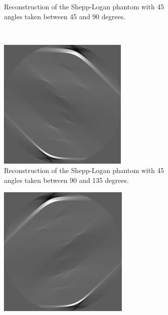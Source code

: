 \begin{figure}
\begin{subfigure}{0.48\linewidth}
		\caption{Reconstruction of the Shepp-Logan phantom with 45 angles taken between 45 and 90 degrees.}
	\end{subfigure}
	\\
	\begin{subfigure}{0.48\linewidth}
		\centering
		\includegraphics[width=\linewidth]{Materials/lin3}
		\caption{Reconstruction of the Shepp-Logan phantom with 45 angles taken between 90 and 135 degrees.}
	\end{subfigure}
	\hfill
	\begin{subfigure}{0.48\linewidth}
		\centering
		\includegraphics[width=\linewidth]{Materials/lin4}

\end{subfigure}
\end{figure}
